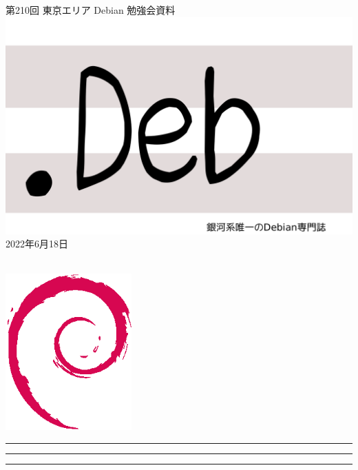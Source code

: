 \documentclass[mingoth,a4paper]{jsarticle}
\newcommand{\debmtgyear}{2022}
\newcommand{\debmtgmonth}{6}
\newcommand{\debmtgdate}{18}
\newcommand{\debmtgnumber}{210}
\begin{document}
\begin{titlepage}
\thispagestyle{empty}

\vspace*{-2cm}
第\debmtgnumber{}回 東京エリア Debian 勉強会資料\\
\hspace*{-2cm}
\includegraphics{image-assets/dotdeb.pdf}\\
\hfill{}\debmtgyear{}年\debmtgmonth{}月\debmtgdate{}日

\\

\vspace*{-2cm}
\hfill{}\includegraphics[height=6cm]{image-assets/openlogo-nd.eps}
\end{titlepage}

\newpage

\begin{minipage}[b]{0.2\hsize}
 \colorbox{titleback}{}
\end{minipage}
\begin{minipage}[b]{0.8\hsize}
\hrule
\vspace{2mm}
\hrule
\begin{multicols}{2}
\tableofcontents
\end{multicols}
\vspace{2mm}
\hrule
\end{minipage}
\end{document}
